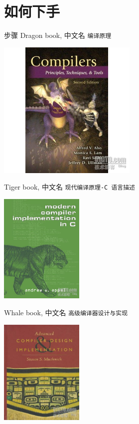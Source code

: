 \documentclass[presentation, bigger]{beamer}
\begin{document}
\section{如何下手}
\label{sec:org58d33f0}
\begin{frame}[fragile,allowframebreaks,label=]{步骤}
 \alert{Dragon book}, 中文名 \texttt{编译原理}
\begin{center}
\includegraphics[width=0.5\textwidth]{./img/dragon.jpg}
\end{center}

\framebreak
\alert{Tiger book}, 中文名 \texttt{现代编译原理-C 语言描述}
\begin{center}
\includegraphics[width=0.3\textwidth]{./img/tiger.jpg}
\end{center}

\framebreak

\alert{Whale book}, 中文名 \texttt{高级编译器设计与实现}
\begin{center}
\includegraphics[width=0.3\textwidth]{./img/whale.jpg}
\end{center}
\end{frame}
\end{document}
